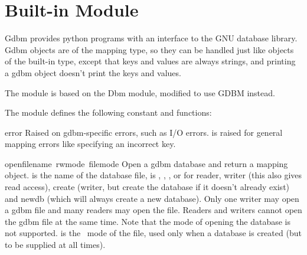 \section{Built-in Module }

Gdbm provides python programs with an interface to the GNU 
database library.  Gdbm objects are of the mapping type, so they can be
handled just like objects of the built-in  type,
except that keys and values are always strings, and printing a gdbm
object doesn't print the keys and values.

The module is based on the Dbm module, modified to use GDBM instead.

The module defines the following constant and functions:

\renewcommand{\indexsubitem}{(in module gdbm)}
\begin{excdesc}{error}
Raised on gdbm-specific errors, such as I/O errors.  is
raised for general mapping errors like specifying an incorrect key.
\end{excdesc}

\begin{funcdesc}{open}{filename\, rwmode\, filemode}
Open a gdbm database and return a mapping object.   is
the name of the database file,  is , ,
, or  for reader, writer (this also gives read
access), create (writer, but create the database if it doesn't already
exist) and newdb (which will always create a new database).  Only one
writer may open a gdbm file and many readers may open the file.  Readers
and writers cannot open the gdbm file at the same time.  Note that the
 mode of opening the database is not supported.
 is the \UNIX\ mode of the file, used only when a
database is created (but to be supplied at all times).
\end{funcdesc}
